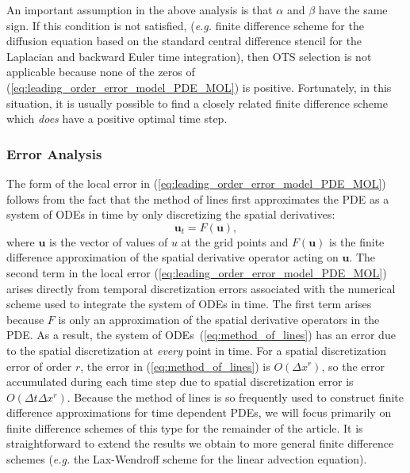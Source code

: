 \documentclass[fleqn,12pt,twoside]{article}
\newcommand{\beq}{\begin{equation}}
\newcommand{\eeq}{\end{equation}}
\def\dt{\Delta t}
\def\dx{\Delta x}
\def\eg{\emph{e.g. }}
\begin{document}
An important assumption in the above analysis is that $\alpha$ and $\beta$ 
have the same sign.  If this condition is not satisfied, (\eg finite
difference scheme for the diffusion equation based on the standard central
difference stencil for the Laplacian and backward Euler time integration),
then OTS selection is not applicable because none of the zeros of 
(\ref{eq:leading_order_error_model_PDE_MOL}) is positive.  Fortunately, 
in this situation, it is usually possible to find a closely related finite 
difference scheme which \emph{does} have a positive optimal time step.

\subsubsection*{\label{sec:error_analysis} 
            Error Analysis}
The form of the local error in 
(\ref{eq:leading_order_error_model_PDE_MOL}) follows from the fact 
that the method of lines first approximates the PDE as a system of ODEs in 
time by only discretizing the spatial derivatives: 
\beq
{\mathbf u}_t = F({\mathbf u}),
\label{eq:method_of_lines}
\eeq
where ${\mathbf u}$ is the vector of values of $u$ at the grid points and
$F({\mathbf u})$ is the finite difference approximation of the spatial 
derivative operator acting on ${\mathbf u}$.  The second term in the local 
error (\ref{eq:leading_order_error_model_PDE_MOL}) arises directly from 
temporal discretization errors associated with the numerical scheme used to 
integrate the system of ODEs in time.  The first term arises because $F$ is 
only an approximation of the spatial derivative operators in the PDE.  As a 
result, the system of ODEs~(\ref{eq:method_of_lines}) has an error due to 
the spatial discretization at \emph{every} point in time.  For a spatial 
discretization error of order $r$, the error in (\ref{eq:method_of_lines}) is 
$O(\dx^r)$, so the error accumulated during each time step due to 
spatial discretization error is $O(\dt \dx^r)$.  Because the method of 
lines is so frequently used to construct finite difference approximations for 
time dependent PDEs, we will focus primarily on finite difference schemes of 
this type for the remainder of the article.  It is straightforward to extend 
the results we obtain to more general finite difference schemes (\eg the
Lax-Wendroff scheme for the linear advection equation). 
\end{document}
